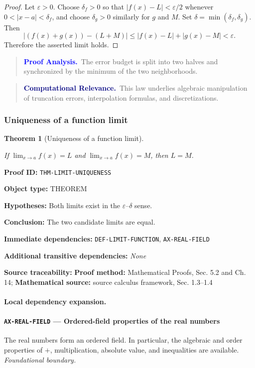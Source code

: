 \documentclass[10pt]{article}
\newcommand{\pidraw}[1]{\begingroup\urlstyle{tt}\nolinkurl{#1}\endgroup}
\newtheorem{theorem}{Theorem}[section]
\theoremstyle{definition}
\theoremstyle{remark}
\newenvironment{proofanalysis}
{\begin{quote}\small\noindent\textbf{\textcolor{blue}{Proof Analysis.}}\ }
{\end{quote}}
\newenvironment{computationalrelevance}
{\begin{quote}\small\noindent\textbf{\textcolor{navy}{Computational Relevance.}}\ }
{\end{quote}}
\newcommand{\meta}[2]{\noindent\textbf{#1:} #2\par}
\begin{document}
\begin{proof}

Let $\varepsilon>0$. Choose $\delta_f>0$ so that
$|f(x)-L|<\varepsilon/2$ whenever $0<|x-a|<\delta_f$, and choose
$\delta_g>0$ similarly for $g$ and $M$. Set
$\delta=\min(\delta_f,\delta_g)$. Then
\[
|(f(x)+g(x))-(L+M)|
\le |f(x)-L|+|g(x)-M|<\varepsilon.
\]
Therefore the asserted limit holds.

\end{proof}

\begin{proofanalysis}The error budget is split into two halves and synchronized by the minimum of the two neighborhoods.\end{proofanalysis}

\begin{computationalrelevance}This law underlies algebraic manipulation of truncation errors, interpolation formulas, and discretizations.\end{computationalrelevance}

\subsubsection{Uniqueness of a function limit}

\begin{theorem}[Uniqueness of a function limit]\label{prf:THM-LIMIT-UNIQUENESS}

If $\lim_{x\to a}f(x)=L$ and $\lim_{x\to a}f(x)=M$, then $L=M$.

\end{theorem}

\meta{Proof ID}{\pidraw{THM-LIMIT-UNIQUENESS}}
\meta{Object type}{THEOREM}
\meta{Hypotheses}{Both limits exist in the $\varepsilon$--$\delta$ sense.}
\meta{Conclusion}{The two candidate limits are equal.}
\meta{Immediate dependencies}{\pidraw{DEF-LIMIT-FUNCTION}, \pidraw{AX-REAL-FIELD}}
\meta{Additional transitive dependencies}{\emph{None}}
\meta{Source traceability}{\textbf{Proof method:} Mathematical Proofs, Sec. 5.2 and Ch. 14; \textbf{Mathematical source:} source calculus framework, Sec. 1.3--1.4}

\paragraph{Local dependency expansion.}

\paragraph{\pidraw{AX-REAL-FIELD} --- Ordered-field properties of the real numbers}
The real numbers form an ordered field. In particular, the algebraic and order properties of $+$, multiplication, absolute value, and inequalities are available.
\textit{Foundational boundary.}
\end{document}
